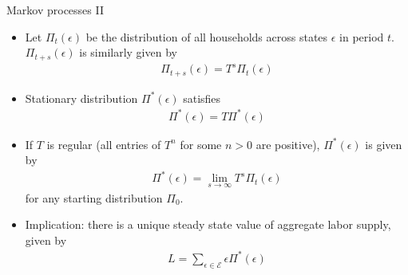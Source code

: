 \documentclass[9pt]{beamer}
\newcommand{\bit}{\begin{itemize}}
\newcommand{\eit}{\end{itemize}}
\newcommand{\bc}{\color{blue}}
\begin{document}
\begin{frame}{Markov processes II}

\bit
\setlength\itemsep{1.5em}

\item Let $\Pi_{t}(\epsilon)$ be the distribution of all households across states $\epsilon$ in period $t$. $\Pi_{t+s}(\epsilon)$ is similarly given by
\begin{eqnarray}
\Pi_{t+s}(\epsilon) = T^s \Pi_{t}(\epsilon)\nonumber
\end{eqnarray}

\item Stationary distribution $\Pi^*(\epsilon)$ satisfies
\begin{eqnarray}
\Pi^{*}(\epsilon) = T \Pi^{*}(\epsilon) \nonumber
\end{eqnarray}

\item If $T$ is {\bc regular} (all entries of $T^n$ for some $n>0$ are positive), $\Pi^{*}(\epsilon)$ is given by
\begin{eqnarray}
\Pi^{*}(\epsilon) = \lim_{s \rightarrow \infty} T^s \Pi_{t}(\epsilon)\nonumber
\end{eqnarray}
for any starting distribution $\Pi_{0}$.


\item Implication: there is a unique steady state value of aggregate labor supply, given by
\begin{eqnarray}
L = \sum_{\epsilon \in \mathcal E} \epsilon \Pi^{*}(\epsilon) \nonumber
\end{eqnarray}
\eit

\end{frame}
\end{document}
